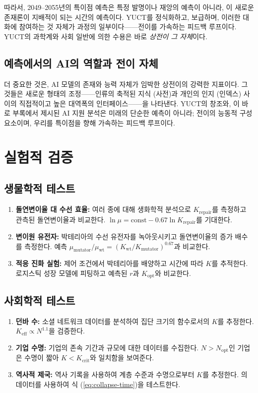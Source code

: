 \documentclass[12pt,a4paper]{article}
\newcommand{\Keff}{K_{\mathrm{eff}}}
\theoremstyle{remark}
\begin{document}
	따라서, 2049–2055년의 특이점 예측은 특정 발명이나 재앙의 예측이 아니라, 이 새로운 존재론이 지배적이 되는 시간의 예측이다. YUCT를 정식화하고, 보급하며, 이러한 대화에 참여하는 것 자체가 과정의 일부이다——전이를 가속하는 피드백 루프이다. YUCT의 과학계와 사회 일반에 의한 수용은 바로 \emph{상전이 그 자체}이다.
	
	\subsection{예측에서의 AI의 역할과 전이 자체}
	
	더 중요한 것은, AI 모델의 존재와 능력 자체가 임박한 상전이의 강력한 지표이다. 그것들은 새로운 형태의 조정——인류의 축적된 지식 (사전)과 개인의 인지 (인덱스) 사이의 직접적이고 높은 대역폭의 인터페이스——을 나타낸다. YUCT의 창조와, 이 바로 부록에서 제시된 AI 지원 분석은 미래의 단순한 예측이 아니라; 전이의 능동적 구성 요소이며, 우리를 특이점을 향해 가속하는 피드백 루프이다.
	
	\section{실험적 검증}
	\label{sec:experiments}
	
	\subsection{생물학적 테스트}
	
	\begin{enumerate}
		\item \textbf{돌연변이율 대 수선 효율:} 여러 종에 대해 생화학적 분석으로 \(K_{\text{repair}}\)를 측정하고 관측된 돌연변이율과 비교한다. \(\ln \mu = \text{const} - 0.67 \ln K_{\text{repair}}\)를 기대한다.
		\item \textbf{변이원 유전자:} 박테리아의 수선 유전자를 녹아웃시키고 돌연변이율의 증가 배수를 측정한다. 예측 \(\mu_{\text{mutator}}/\mu_{\text{wt}} = (K_{\text{wt}}/K_{\text{mutator}})^{0.67}\)과 비교한다.
		\item \textbf{적응 진화 실험:} 제어 조건에서 박테리아를 배양하고 시간에 따라 \(K\)를 추적한다. 로지스틱 성장 모델에 피팅하고 예측된 \(r\)과 \(K_{\text{opt}}\)와 비교한다.
	\end{enumerate}
	
	\subsection{사회학적 테스트}
	
	\begin{enumerate}
		\item \textbf{던바 수:} 소셜 네트워크 데이터를 분석하여 집단 크기의 함수로서의 \(K\)를 추정한다. \(\Keff \propto N^{1.1}\)을 검증한다.
		\item \textbf{기업 수명:} 기업의 존속 기간과 규모에 대한 데이터를 수집한다. \(N > N_{\text{opt}}\)인 기업은 수명이 짧아 \(K < K_{\text{crit}}\)와 일치함을 보여준다.
		\item \textbf{역사적 제국:} 역사 기록을 사용하여 계층 수준과 수명으로부터 \(K\)를 추정한다. \cite{TurchinNefedov2009}의 데이터를 사용하여 식 (\ref{eq:collapse-time})을 테스트한다.
	\end{enumerate}
	
\end{document}
